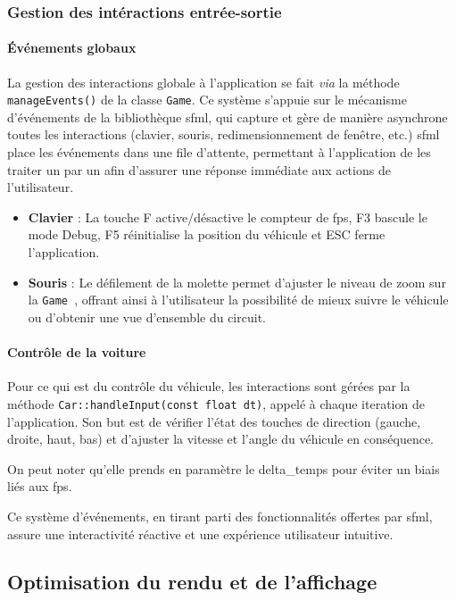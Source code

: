 \subsubsection{Gestion des intéractions entrée-sortie}\label{subsubsec:gestion-des-interactions-entree-sortie}
\paragraph{Événements globaux}
La gestion des interactions globale à l'application se fait \textit{via} la méthode \texttt{manageEvents()} de la classe \texttt{Game}.
Ce système s'appuie sur le mécanisme d'événements de la bibliothèque \gls{sfml}, qui capture et gère de manière asynchrone toutes les interactions (clavier, souris, redimensionnement de fenêtre, etc.)
\gls{sfml} place les événements dans une file d'attente, permettant à l'application de les traiter un par un afin d'assurer une réponse immédiate aux actions de l'utilisateur.

\begin{itemize}
    \item \textbf{Clavier} : La touche F active/désactive le compteur de \gls{fps}, F3 bascule le mode Debug, F5 réinitialise la position du véhicule et ESC ferme l'application.
    \item \textbf{Souris} : Le défilement de la molette permet d'ajuster le niveau de zoom sur la \texttt{Game }, offrant ainsi à l'utilisateur la possibilité de mieux suivre le véhicule ou d'obtenir une vue d'ensemble du circuit.
\end{itemize}

\paragraph{Contrôle de la voiture}
Pour ce qui est du contrôle du véhicule, les interactions sont gérées par la méthode \texttt{Car::handleInput(const float dt)}, appelé à chaque iteration de l'application.
Son but est de vérifier l'état des touches de direction (gauche, droite, haut, bas) et d'ajuster la vitesse et l'angle du véhicule en conséquence.

On peut noter qu'elle prends en paramètre le \gls{delta_temps} pour éviter un biais liés aux \gls{fps}.

Ce système d'événements, en tirant parti des fonctionnalités offertes par \gls{sfml}, assure une interactivité réactive et une expérience utilisateur intuitive.

\subsection{Optimisation du rendu et de l'affichage}\label{subsec:optimisation-du-rendu-et-de-l-affichage}
